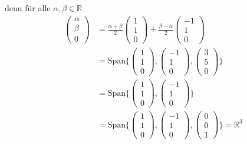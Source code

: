\documentclass[11pt]{report}
\newcommand*\Zb[1] {\mathbb{#1}}
\begin{document}
denn für alle $\alpha, \beta \in \Zb{R}$
\begin{align}
 \begin{pmatrix} \alpha \\ \beta \\ 0 \end{pmatrix} &= \frac{\alpha+\beta}{2}  \begin{pmatrix} 1 \\ 1 \\ 0 \end{pmatrix} + \frac{\beta-\alpha}{2}\begin{pmatrix} -1 \\ 1 \\ 0 \end{pmatrix} \\
&= \text{Span}\{\begin{pmatrix} 1 \\ 1 \\ 0 \end{pmatrix}, \begin{pmatrix} -1 \\ 1 \\ 0 \end{pmatrix}, \begin{pmatrix} 3 \\ 5 \\ 0 \end{pmatrix}\} \\ 
& = \text{Span}\{\begin{pmatrix} 1 \\ 1 \\ 0 \end{pmatrix}, \begin{pmatrix} -1 \\ 1 \\ 0 \end{pmatrix}\} \\
& = \text{Span}\{\begin{pmatrix} 1 \\ 1 \\ 0 \end{pmatrix}, \begin{pmatrix} -1 \\ 1 \\ 0 \end{pmatrix}, 
\begin{pmatrix} 0 \\ 0 \\ 1 \end{pmatrix}\} =  \Zb{R}^3
\end{align}
\end{document}
